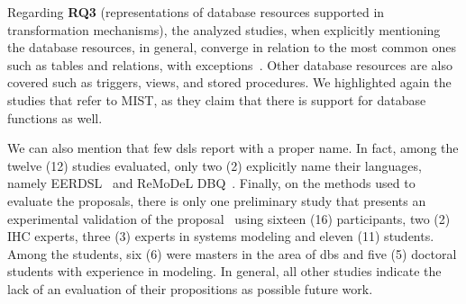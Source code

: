Regarding \textbf {RQ3} (representations of database resources supported in transformation mechanisms), the analyzed studies, when explicitly mentioning the database resources, in general, converge in relation to the most common ones such as tables and relations, with exceptions~\cite{Dey:1999}.
Other database resources are also covered such as triggers, views, and stored procedures.
We highlighted again the studies that refer to MIST, as they claim that there is support for database functions as well.

We can also mention that few \acp{dsl} report with a proper name.
In fact, among the twelve (12) studies evaluated, only two (2) explicitly name their languages, namely EERDSL~\cite{Ristic:2016, Dimitrieski:2015, Dimitrieski:2014} and ReMoDeL DBQ~\cite{Subahi:2011}.
Finally, on the methods used to evaluate the proposals, there is only one preliminary study that presents an experimental validation of the proposal~\cite{Dimitrieski:2015} using sixteen (16) participants, two (2) IHC experts, three (3) experts in systems modeling and eleven (11) students. 
Among the students, six (6) were masters in the area of \acp{db} and five (5) doctoral students with experience in modeling.
In general, all other studies indicate the lack of an evaluation of their propositions as possible future work.



